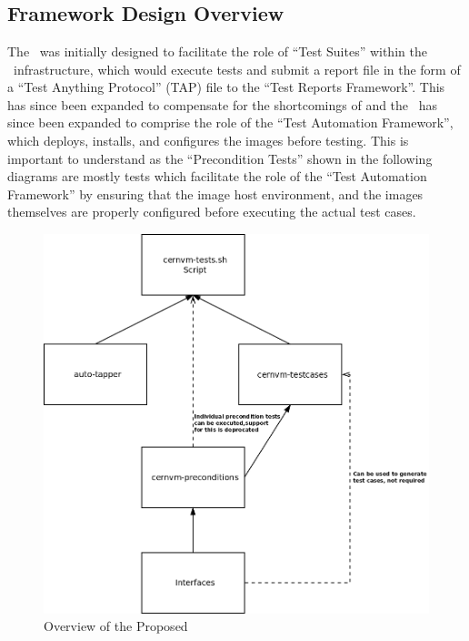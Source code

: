 \chapter{\cernvmtestframework}
\section{Framework Design Overview}
\label{sec:frameworkoverview}

The \cernvmtestframework\ was initially designed to facilitate the role of ``Test Suites'' within the \releasetesting~infrastructure, which would 
execute tests and submit a report file in the form of a ``Test Anything Protocol'' (TAP) file to the ``Test Reports Framework''. This has since been
expanded to compensate for the shortcomings of \tapper and the \cernvmtestframework\ has since been expanded to comprise the role of the ``Test
Automation Framework'', which deploys, installs, and configures the \cernvm images before testing. This is important to understand as the 
``Precondition Tests'' shown in the following diagrams are mostly tests which facilitate the role of the ``Test Automation Framework'' by ensuring
that the \cernvm image host environment, and the images themselves are properly configured before executing the actual \cernvmreleasetesting test
cases.

\begin{figure}[!hbp]
	\begin{center}
		\includegraphics[scale=0.19]{img/proposed_framework.png}
	\end{center}
	\caption{Overview of the Proposed \cernvmtestframework}
	\label{fig:proposedarchitecture}
\end{figure}

